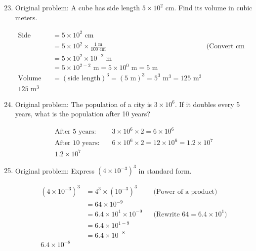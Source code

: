 \documentclass{article}
\begin{document}
\begin{enumerate}
\setcounter{enumi}{22}

\item
Original problem: A cube has side length $5 \times 10^2$ cm. Find its volume in cubic meters.

\begin{align*}
\text{Side length} &= 5 \times 10^2 \text{ cm} \\
&= 5 \times 10^2 \times \frac{1 \text{ m}}{100 \text{ cm}} && \text{(Convert cm to m)} \\
&= 5 \times 10^2 \times 10^{-2} \text{ m} \\
&= 5 \times 10^{2 - 2} \text{ m} = 5 \times 10^{0} \text{ m} = 5 \text{ m} \\
\text{Volume} &= (\text{side length})^3 = (5 \text{ m})^3 = 5^3 \text{ m}^3 = 125 \text{ m}^3 \\
\boxed{125 \text{ m}^3}
\end{align*}

\item
Original problem: The population of a city is $3 \times 10^6$. If it doubles every 5 years, what is the population after 10 years?

\begin{align*}
\text{After 5 years:} &\quad 3 \times 10^6 \times 2 = 6 \times 10^6 \\
\text{After 10 years:} &\quad 6 \times 10^6 \times 2 = 12 \times 10^6 = 1.2 \times 10^7 \\
\boxed{1.2 \times 10^{7}}
\end{align*}

\item
Original problem: Express $(4 \times 10^{-3})^3$ in standard form.

\begin{align*}
(4 \times 10^{-3})^3 &= 4^3 \times (10^{-3})^3 && \text{(Power of a product)} \\
&= 64 \times 10^{-9} \\
&= 6.4 \times 10^{1} \times 10^{-9} && \text{(Rewrite }64 = 6.4 \times 10^1) \\
&= 6.4 \times 10^{1 - 9} \\
&= 6.4 \times 10^{-8} \\
\boxed{6.4 \times 10^{-8}}
\end{align*}
\end{enumerate}
\end{document}
